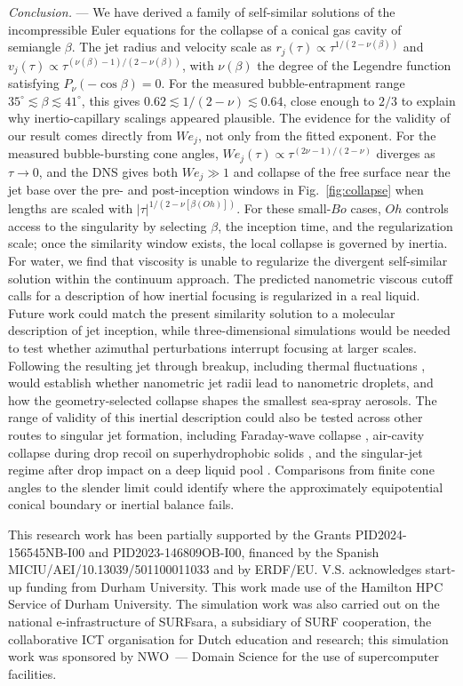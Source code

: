 \documentclass[aps,prl,reprint,floatfix]{revtex4-2}
\begin{document}
\emph{Conclusion.} --- We have derived a family of self-similar solutions of the incompressible Euler equations for the collapse of a conical gas cavity of semiangle $\beta$. The jet radius and velocity scale as $r_j(\tau)\propto \tau^{1/(2-\nu(\beta))}$ and $v_j(\tau)\propto \tau^{(\nu(\beta)-1)/(2-\nu(\beta))}$, with $\nu(\beta)$ the degree of the Legendre function satisfying $P_\nu(-\cos\beta)=0$. For the measured bubble-entrapment range $35^\circ\lesssim\beta\lesssim41^\circ$, this gives $0.62\lesssim1/(2-\nu)\lesssim0.64$, close enough to $2/3$ to explain why inertio-capillary scalings appeared plausible.
The evidence for the validity of our result comes directly from $We_j$, not only from the fitted exponent. For the measured bubble-bursting cone angles, $We_j(\tau)\propto \tau^{(2\nu-1)/(2-\nu)}$ diverges as $\tau\rightarrow0$, and the DNS gives both $We_j\gg1$ and collapse of the free surface near the jet base over the pre- and post-inception windows in Fig.~\ref{fig:collapse} when lengths are scaled with $|\tau|^{1/(2-\nu[\beta(Oh)])}$. For these small-$Bo$ cases, $Oh$ controls access to the singularity by selecting $\beta$, the inception time, and the regularization scale; once the similarity window exists, the local collapse is governed by inertia. For water, we find that viscosity is unable to regularize the divergent self-similar solution within the continuum approach.
The predicted nanometric viscous cutoff calls for a description of how inertial focusing is regularized in a real liquid. Future work could match the present similarity solution to a molecular description of jet inception, while three-dimensional simulations would be needed to test whether azimuthal perturbations interrupt focusing at larger scales. Following the resulting jet through breakup, including thermal fluctuations \cite{MoselerLandman2000,Eggers2002}, would establish whether nanometric jet radii lead to nanometric droplets, and how the geometry-selected collapse shapes the smallest sea-spray aerosols.
The range of validity of this inertial description could also be tested across other routes to singular jet formation, including Faraday-wave collapse \cite{Zeff}, air-cavity collapse during drop recoil on superhydrophobic solids \cite{ZhangForces2022}, and the singular-jet regime after drop impact on a deep liquid pool \cite{Thoroddsen_18,Thoroddsen_2020,Tian2023,Michon}. Comparisons from finite cone angles to the slender limit could identify where the approximately equipotential conical boundary or inertial balance fails.

\begin{acknowledgements}
This research work has been partially supported by the Grants PID2024-156545NB-I00 and PID2023-146809OB-I00, financed by the Spanish MICIU/AEI/10.13039/501100011033 and by ERDF/EU. V.S. acknowledges start-up funding from Durham University. This work made use of the Hamilton HPC Service of Durham University. The simulation work was also carried out on the national e-infrastructure of SURFsara, a subsidiary of SURF cooperation, the collaborative ICT organisation for Dutch education and research; this simulation work was sponsored by NWO~--- Domain Science for the use of supercomputer facilities.
\end{acknowledgements}
\end{document}
